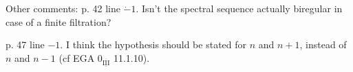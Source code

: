Other comments: p. 42 line \(\dot{-}1\). Isn't the spectral sequence actually biregular in case of a finite filtration?

p. 47 line \(-1\). I think the hypothesis should be stated for \(n\) and \(n+1\), instead of \(n\) and \(n-1\) (cf EGA \(0_{\overline{\underline{\mathrm{III}}}}\) 11.1.10).
\clearpage
